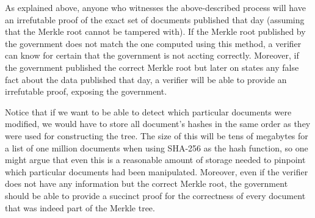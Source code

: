 As explained above, anyone who witnesses the above-described process will have an irrefutable proof of the exact set of documents published that day (assuming that the Merkle root cannot be tampered with). If the Merkle root published by the government does not match the one computed using this method, a verifier can know for certain that the government is not accting correctly. Moreover, if the government published the correct Merkle root but later on states any false fact about the data published that day, a verifier will be able to provide an irrefutable proof, exposing the government.

Notice that if we want to be able to detect which particular documents were modified, we would have to store all document's hashes in the same order as they were used for constructing the tree. The size of this will be tens of megabytes for a list of one million documents when using SHA-256 as the hash function, so one might argue that even this is a reasonable amount of storage needed to pinpoint which particular documents had been manipulated. Moreover, even if the verifier does not have any information but the correct Merkle root, the government should be able to provide a succinct proof for the correctness of every document that was indeed part of the Merkle tree.


